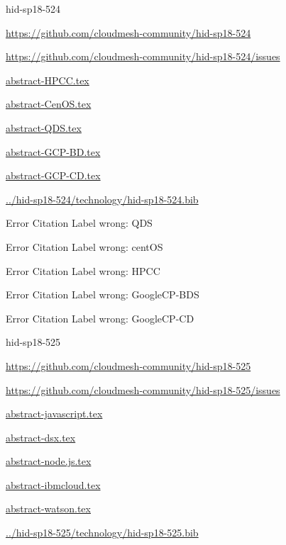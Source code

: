 \begin{IU}

hid-sp18-524

\url{https://github.com/cloudmesh-community/hid-sp18-524}

\url{https://github.com/cloudmesh-community/hid-sp18-524/issues}

\href{https://github.com/cloudmesh-community/hid-sp18-524/blob/master//technology/abstract-HPCC.tex}{abstract-HPCC.tex}

\href{https://github.com/cloudmesh-community/hid-sp18-524/blob/master//technology/abstract-CenOS.tex}{abstract-CenOS.tex}

\href{https://github.com/cloudmesh-community/hid-sp18-524/blob/master//technology/abstract-QDS.tex}{abstract-QDS.tex}

\href{https://github.com/cloudmesh-community/hid-sp18-524/blob/master//technology/abstract-GCP-BD.tex}{abstract-GCP-BD.tex}

\href{https://github.com/cloudmesh-community/hid-sp18-524/blob/master//technology/abstract-GCP-CD.tex}{abstract-GCP-CD.tex}

\href{https://github.com/cloudmesh-community/hid-sp18-524/blob/master//technology/hid-sp18-524.bib}{../hid-sp18-524/technology/hid-sp18-524.bib}

 Error Citation Label wrong: QDS

 Error Citation Label wrong: centOS

 Error Citation Label wrong: HPCC

 Error Citation Label wrong: GoogleCP-BDS

 Error Citation Label wrong: GoogleCP-CD

\end{IU}


\begin{IU}

hid-sp18-525

\url{https://github.com/cloudmesh-community/hid-sp18-525}

\url{https://github.com/cloudmesh-community/hid-sp18-525/issues}

\href{https://github.com/cloudmesh-community/hid-sp18-525/blob/master//technology/abstract-javascript.tex}{abstract-javascript.tex}

\href{https://github.com/cloudmesh-community/hid-sp18-525/blob/master//technology/abstract-dsx.tex}{abstract-dsx.tex}

\href{https://github.com/cloudmesh-community/hid-sp18-525/blob/master//technology/abstract-node.js.tex}{abstract-node.js.tex}

\href{https://github.com/cloudmesh-community/hid-sp18-525/blob/master//technology/abstract-ibmcloud.tex}{abstract-ibmcloud.tex}

\href{https://github.com/cloudmesh-community/hid-sp18-525/blob/master//technology/abstract-watson.tex}{abstract-watson.tex}

\href{https://github.com/cloudmesh-community/hid-sp18-525/blob/master//technology/hid-sp18-525.bib}{../hid-sp18-525/technology/hid-sp18-525.bib}

\end{IU}


